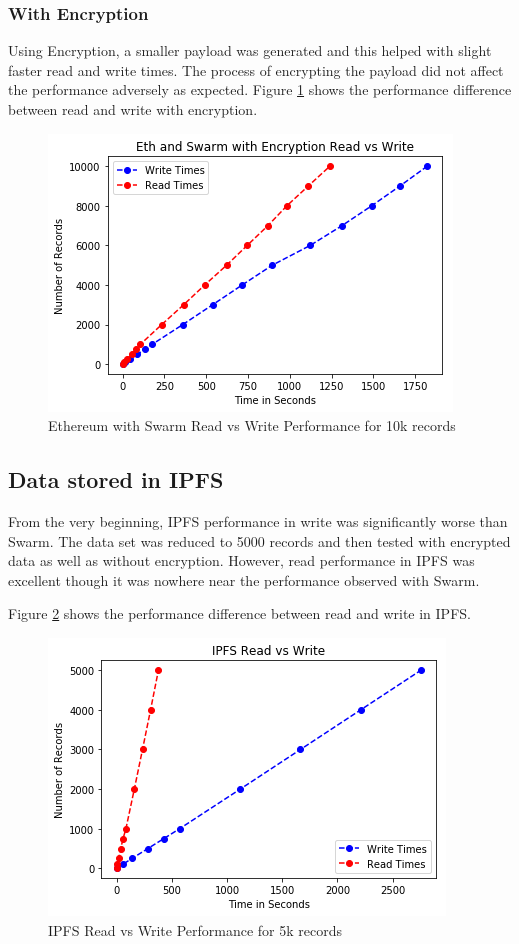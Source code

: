 \documentclass[11pt,openright]{report}
\begin{document}
\subsubsection{With Encryption}
Using Encryption, a smaller payload was generated and this helped with slight faster read and write times. The process of encrypting the payload did not affect the performance adversely as expected. Figure \ref{fig:graph_eth_swarm_encr_readvwrite} shows the performance difference between read and write with encryption.

\begin{figure}
	\centering
	\includegraphics[scale=1]{results/Eth+Sw+EncrRvW.png}
	\caption{Ethereum with Swarm Read vs Write Performance for 10k records}
	\label{fig:graph_eth_swarm_encr_readvwrite}
\end{figure}
\newpage

\subsection{Data stored in IPFS}
From the very beginning, IPFS performance in write was significantly worse than Swarm. The data set was reduced to 5000 records and then tested with encrypted data as well as without encryption. However, read performance in IPFS was excellent though it was nowhere near the performance observed with Swarm.

Figure \ref{fig:graph_ipfs_readvwrite} shows the performance difference between read and write in IPFS.

\begin{figure}
	\centering
	\includegraphics[scale=1]{results/IPFS_read_vs_write.png}
	\caption{IPFS Read vs Write Performance for 5k records}
	\label{fig:graph_ipfs_readvwrite}
\end{figure}
\newpage
\end{document}
